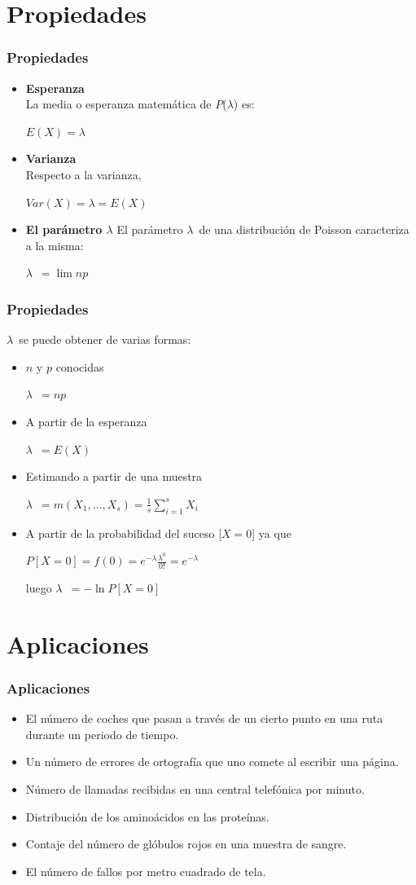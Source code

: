 \documentclass{beamer}
\newcommand{\LAl}{{\lambda}}
\newcommand{\LA}{{$\lambda$}}
\begin{document}
\section{Propiedades}
\begin{frame}
\frametitle{Propiedades}
\begin{itemize}
\item \textbf{\large Esperanza}\\
La media o esperanza matemática de $P$(\LA) es:
\centerline {$E(X)=$\LA}
\item \textbf{\large Varianza}\\
Respecto a la varianza,
\centerline {$Var(X)=\LAl=E(X)$}
\item \textbf{\large El parámetro \LA}
El parámetro \LA \ de una distribución de Poisson caracteriza a la misma:
\centerline {\LA \ $ = \displaystyle\lim{np}$}
\end{itemize}
\end{frame}
\begin{frame}
\frametitle{Propiedades}
\LA \ se puede obtener de varias formas:
\begin{itemize}
\item $n$ y $p$ conocidas
\centerline {\LA \ $ = np$}
\item A partir de la esperanza
\centerline {\LA \ $ = E(X)$}
\item Estimando a partir de una muestra
\centerline {\LA \ $ = m( X_1,\dots,X_s) = \frac{1}{s}\displaystyle\sum_{i=1}^s X_i$} 
\item A partir de la probabilidad del suceso [$X=0$] ya que
\centerline {$P[X=0] = f(0) = e^{-\LAl}\frac{\LAl^{0}}{0!} = e^{-\LAl}$}
luego \LA \ $ = -\ln P[X=0]$
\end{itemize}
\end{frame}
\section{Aplicaciones}
\begin{frame}
\frametitle{Aplicaciones}
\begin{itemize}
\item El número de coches que pasan a través de un cierto punto en una ruta durante un periodo de tiempo.\pause
\item Un número de errores de ortografía que uno comete al escribir una página.\pause
\item Número de llamadas recibidas en una central telefónica por minuto.\pause
\item Distribución de los aminoácidos en las proteínas.\pause
\item Contaje del número de glóbulos rojos en una muestra de sangre.\pause
\item El número de fallos por metro cuadrado de tela.\pause
\end{itemize}
\end{frame}
\end{document}
